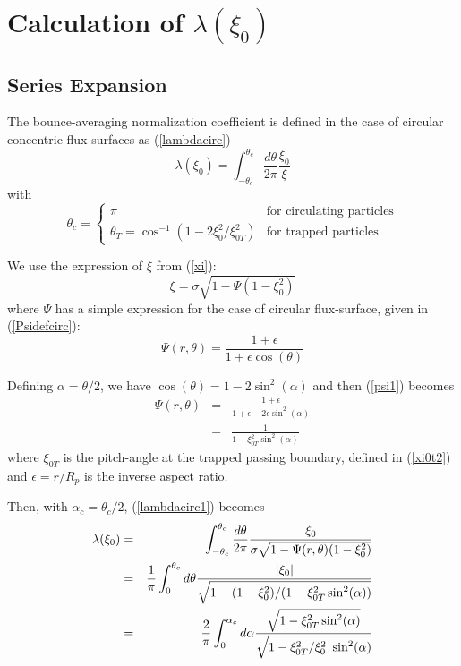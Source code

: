 
\section{Calculation of $\lambda(\xi_0)$}\label{lambdacalcl}
\subsection{Series Expansion}

The bounce-averaging normalization coefficient is defined in the case of
circular concentric flux-surfaces as (\ref{lambdacirc})
\begin{equation}
\lambda (\xi _{0})=\int_{-\theta _{c}}^{\theta _{c}}\frac{d\theta }{2\pi }%
\frac{\xi _{0}}{\xi }  \label{lambdacirc1}
\end{equation}
with
\begin{equation}
\theta _{c}=\left\{
\begin{array}{ll}
\pi & \text{for circulating particles} \\
\theta _{T}=\cos ^{-1}\left( 1-2\xi _{0}^{2}/\xi _{0T}^{2}\right) & \text{
for trapped particles}
\end{array}
\right.  \label{thetac}
\end{equation}

We use the expression of $\xi $ from (\ref{xi}):
\begin{equation}
\xi =\sigma \sqrt{1-\Psi (1-\xi _{0}^{2})}  \label{xi3}
\end{equation}
where $\Psi $ has a simple expression for the case of circular flux-surface,
given in (\ref{Psidefcirc}):
\begin{equation}
\Psi (r,\theta )=\frac{1+\epsilon }{1+\epsilon \cos (\theta )}  \label{psi1}
\end{equation}

Defining $\alpha =\theta /2$, we have $\cos (\theta )=1-2\sin ^{2}(\alpha )$
and then (\ref{psi1}) becomes
\begin{eqnarray}
\Psi (r,\theta ) &=&\frac{1+\epsilon }{1+\epsilon -2\epsilon \sin
^{2}(\alpha )}  \nonumber  \label{psi2} \\
&=&\frac{1}{1-\xi _{0T}^{2}\sin ^{2}(\alpha )}
\end{eqnarray}
where $\xi _{0T}$ is the pitch-angle at the trapped passing boundary,
defined in (\ref{xi0t2}) and $\epsilon =r/R_{p}$ is the inverse aspect ratio.

Then, with $\alpha _{c}=\theta _{c}/2$, (\ref{lambdacirc1}) becomes
\begin{eqnarray}
\lambda (\xi _{0}) &=&\int_{-\theta _{c}}^{\theta _{c}}\frac{d\theta }{2\pi }%
\frac{\xi _{0}}{\sigma \sqrt{1-\Psi (r,\theta )(1-\xi _{0}^{2})}}  \nonumber
\label{lambda2} \\
&=&\frac{1}{\pi }\int_{0}^{\theta _{c}}d\theta \frac{|\xi _{0}|}{\sqrt{%
1-(1-\xi _{0}^{2})/(1-\xi _{0T}^{2}\sin ^{2}(\alpha ))}}  \nonumber \\
&=&\frac{2}{\pi }\int_{0}^{\alpha _{c}}d\alpha \frac{\sqrt{1-\xi
_{0T}^{2}\sin ^{2}(\alpha )}}{\sqrt{1-\xi _{0T}^{2}/\xi _{0}^{2}\ \sin
^{2}(\alpha )}}
\end{eqnarray}

